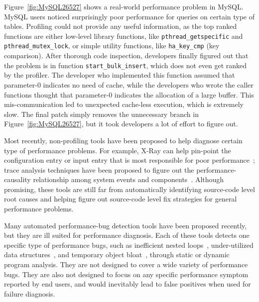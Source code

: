 Figure~\ref{fig:MySQL26527}
shows a real-world performance problem in MySQL. MySQL users noticed 
surprisingly poor performance for queries on certain type of tables.
Profiling could not
provide any useful information, as the top ranked
functions are either low-level library functions, like 
\texttt{pthread\_getspecific} and \texttt{pthread\_mutex\_lock}, or simple 
utility
functions, like \texttt{ha\_key\_cmp} (key comparison). 
After thorough code inspection, developers finally figured
out that the problem is in function \texttt{start\_bulk\_insert}, which does
not even get ranked by the profiler.
The developer who implemented this
function assumed that parameter-0 indicates no need of cache, while the 
developers who 
wrote the caller functions thought that parameter-0 indicates the allocation of a
large buffer. This mis-communication led to unexpected cache-less execution, 
which is extremely slow. The final patch simply removes the unnecessary
branch in Figure~\ref{fig:MySQL26527}, but it took developers a lot of 
effort to figure out. 

Most recently, non-profiling tools have been proposed to help diagnose certain
type of performance problems. For example, X-Ray can help pin-point the 
configuration entry or input entry that is most responsible for poor 
performance~\citep{XRayOSDI}; trace analysis
techniques have been proposed to figure out the performance-causality 
relationship among system events and components~\citep{TaoAsplos2014,amertrace}. 
Although promising, these tools are still
far from automatically identifying
source-code level root causes and helping figure out
source-code level fix
strategies for general performance problems.

Many automated performance-bug detection tools have been proposed recently,
but they are ill suited for performance diagnosis.
Each of these tools detects one specific type of performance bugs,
such as inefficient nested loops~\citep{Alabama}, under-utilized data 
structures~\citep{XuDataStructure}, 
and temporary object bloat~\citep{BloatFSE2008, XuBloatPLDI2009, XuBloatPLDI2010},
through static or dynamic program analysis. They are not designed to cover a wide variety
of performance bugs. They are also not designed to focus on any specific
performance symptom reported by end users, and would inevitably lead to false 
positives when
used for failure diagnosis.


